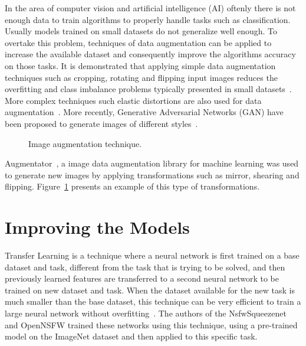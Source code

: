 In the area of computer vision and artificial intelligence (AI) oftenly there is not enough data to train algorithms to properly handle tasks such as classification. Usually models trained on small datasets do not generalize well enough. To overtake this problem, techniques of data augmentation can be applied to increase the available dataset and consequently improve the algorithms accuracy on those tasks. It is demonstrated that applying simple data augmentation techniques such as cropping, rotating and flipping input images reduces the overfitting and class imbalance problems typically presented in small datasets~\cite{Wong2016}. More complex techniques such elastic distortions are also used for data augmentation~\cite{Simard2003}.
More recently, Generative Adversarial Networks (GAN) have been proposed to generate images of different styles~\cite{Creswell2018, DBLP:journals/corr/abs-1712-04621}.

\begin{figure}[H]
\centering
	\qquad\qquad
\caption{Image augmentation technique.}
\label{fig:image_augmentation}
\end{figure}


Augmentator~\cite{DBLP:journals/corr/abs-1708-04680}, a image data augmentation library for machine learning was used to generate new images by applying transformations such as mirror, shearing and flipping. Figure~\ref{fig:image_augmentation} presents an example of this type of transformations.





\section{Improving the Models}

Transfer Learning is a technique where a neural network is first trained on a base dataset and task, different from the task that is trying to be solved, and then previously learned features are transferred to a second neural network to be trained on new dataset and task. When the dataset available for the new task is much smaller than the base dataset, this technique can be very efficient to train a large neural network without overfitting~\cite{DBLP:journals/corr/YosinskiCBL14}. The authors of the NsfwSqueezenet and OpenNSFW trained these networks using this technique, using a pre-trained model on the ImageNet dataset and then applied to this specific task.

